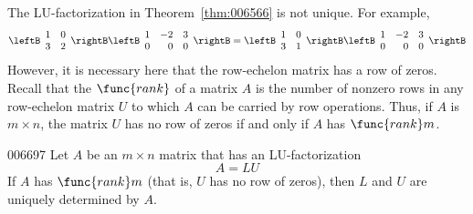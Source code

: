 The LU-factorization in Theorem~\ref{thm:006566} is not unique. For example,
\begin{equation*}
\leftB \begin{array}{rr}
1 & 0 \\
3 & 2
\end{array} \rightB \leftB \begin{array}{rrr}
1 & -2 & 3 \\
0 & 0 & 0
\end{array} \rightB = \leftB \begin{array}{rr}
1 & 0 \\
3 & 1
\end{array} \rightB \leftB \begin{array}{rrr}
1 & -2 & 3 \\
0 & 0 & 0
\end{array} \rightB
\end{equation*}
However, it is necessary here that the row-echelon matrix has a row of zeros. Recall that the $\func{rank}$ of a matrix $A$ is the number of nonzero rows in any row-echelon matrix $U$ to which $A$ can be carried by row operations. Thus, if $A$ is $m \times n$, the matrix $U$ has no row of zeros if and only if $A$ has $\func{rank }m$.

\begin{theorem}{}{006697}
Let $A$ be an $m \times n$ matrix that has an LU-factorization
\begin{equation*}
A = LU
\end{equation*}
If $A$ has $\func{rank }m$ (that is, $U$ has no row of zeros), then $L$ and $U$ are uniquely determined by $A$.
\end{theorem}

